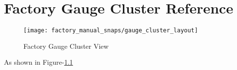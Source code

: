 \chapter{Factory Gauge Cluster Reference}
\begin{figure}[h]
  \texttt{[image: factory\_manual\_snaps/gauge\_cluster\_layout]}
  \centering
  \caption{Factory Gauge Cluster View}
  \label{fig:factory_gauge_cluster_view}
\end{figure}


As shown in Figure-\ref{fig:factory_gauge_cluster_view}
